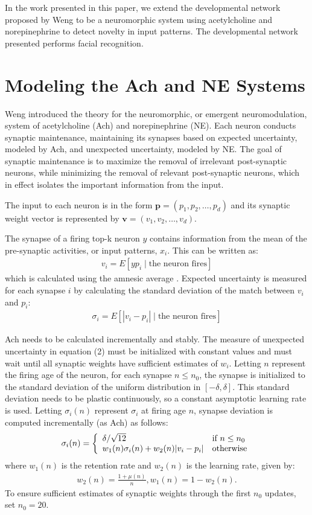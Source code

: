 \documentclass[conference]{IEEEtran}
\begin{document}
In the work presented in this paper, we extend the developmental network proposed by Weng \cite{WengNAI12} to be a neuromorphic system using acetylcholine and norepinephrine to detect novelty in input patterns. The developmental network presented performs facial recognition.  

\section{Modeling the Ach and NE Systems}
Weng \cite{WengNAI12} introduced the theory for the neuromorphic, or emergent neuromodulation, system of acetylcholine (Ach) and norepinephrine (NE). Each neuron conducts synaptic maintenance, maintaining its synapses based on expected uncertainty, modeled by Ach, and unexpected uncertainty, modeled by NE. The goal of synaptic maintenance is to maximize the removal of irrelevant post-synaptic neurons, while minimizing the removal of relevant post-synaptic neurons, which in effect isolates the important information from the input.

The input to each neuron is in the form $\mathbf{p}=(p_1,p_2,\dots,p_d)$ and its synaptic weight vector is represented by $\mathbf{v}=(v_1,v_2,\dots,v_d)$.

The synapse of a firing top-k neuron $y$ contains information from the mean of the pre-synaptic activities, or input patterns, $x_i$. This can be written as:
\begin{align}v_i=E[yp_i\; | \;\text{the neuron fires}] \end{align}
which is calculated using the amnesic average \cite{WengNAI12}. Expected uncertainty is measured for each synapse $i$ by calculating the standard deviation of the match between $v_i$ and $p_i$:
\begin{align}\sigma_i=E[|v_i-p_i|\;|\;\text{the neuron fires}]\end{align}

Ach needs to be calculated incrementally and stably. The measure of unexpected uncertainty in equation (2) must be initialized with constant values and must wait until all synaptic weights have sufficient estimates of $w_i$. Letting $n$ represent the firing age of the neuron, for each synapse $n \le n_0$, the synapse is initialized to the standard deviation of the uniform distribution in $[-\delta,\delta]$. This standard deviation needs to be plastic continuously, so a constant asymptotic learning rate is used. Letting $\sigma_i(n)$ represent $\sigma_i$ at firing age $n$, synapse deviation is computed incrementally (as Ach) as follows:
\begin{align}\sigma_i(n)=\left\{
\begin{array}{l l}
\delta/\sqrt{12} &\text{if $n \le n_0$}\\
w_1(n)\sigma_i(n)+w_2(n)|v_i-p_i| & \text{otherwise}
\end{array}\right.\end{align}
where $w_1(n)$ is the retention rate and $w_2(n)$ is the learning rate, given by:
\begin{align}w_2(n)=\frac{1+\mu(n)}{n},w_1(n)=1-w_2(n). \nonumber 
\end{align}
To ensure sufficient estimates of synaptic weights through the first $n_0$ updates, set $n_0=20$. 
\end{document}
